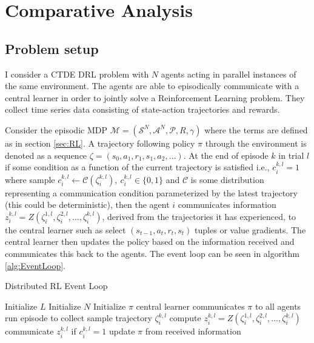 \chapter{Comparative Analysis}

\section{Problem setup}

I consider a CTDE DRL problem with $N$ agents acting in parallel instances of the same environment.
The agents are able to episodically communicate with a central learner in order to jointly solve a Reinforcement Learning problem.
They collect time series data consisting of state-action trajectories and rewards.

Consider the episodic MDP $\mathcal{M}= (\mathcal{S}^N, \mathcal{A}^N, \mathcal{P}, R,\gamma)$ where the terms are defined as in section \ref{sec:RL}.
A trajectory following policy $\pi$ through the environment is denoted as a sequence $\zeta = (s_0, a_1, r_1, s_1, a_2, \dots)$.
At the end of episode $k$ in trial $l$ if some condition as a function of the current trajectory is satisfied i.e., $c^{k,l}_i=1$ where sample $c^{k,l}_i \leftarrow \mathcal{C}(\zeta^{k,l}_i), \ c^{k,l}_i \in \{0,1\}$ and $\mathcal{C}$ is some distribution representing a communication condition parameterized by the latest trajectory (this could be deterministic), then the agent $i$ communicates information $z^{k,l}_i=Z(\zeta^{1,l}_i,\zeta^{2,l}_i,\dots, \zeta^{k,l}_i)$, derived from the trajectories it has experienced, to the central learner such as select $(s_{t-1},a_t,r_t,s_t)$ tuples or value gradients.
The central learner then updates the policy based on the information received and communicates this back to the agents. 
The event loop can be seen in algorithm \ref{alg:EventLoop}.

\begin{algorithm}
    \caption{Distributed RL Event Loop}\label{alg:EventLoop}
    \begin{algorithmic}
            \State Initialize $L$ 
            \State Initialize $N$ 
            \State Initialize $\pi$
            \State central learner communicates $\pi$ to all agents
            \State run episode to collect sample trajectory $\zeta^{k,l}_i$ %
            \State compute $z^{k,l}_i = Z(\zeta^{1,l}_i,\zeta^{2,l}_i,\dots, \zeta^{k,l}_i)$
            \State communicate $z^{k,l}_i$ if $c^{k,l}_i = 1$
            \EndFor
            \State update $\pi$ from received information
            \EndFor
            \EndFor
    \end{algorithmic}
\end{algorithm}

